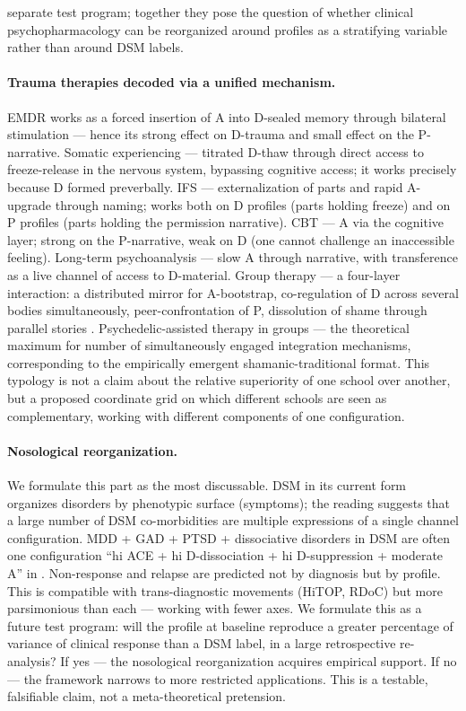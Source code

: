 separate test program; together they pose the question of whether clinical psychopharmacology can be reorganized around \DEIC{} profiles as a stratifying variable rather than around DSM labels.

\paragraph{Trauma therapies decoded via a unified \DEIC{} mechanism.} EMDR works as a forced insertion of A into D-sealed memory through bilateral stimulation --- hence its strong effect on D-trauma and small effect on the P-narrative. Somatic experiencing \citep{levine2015} --- titrated D-thaw through direct access to freeze-release in the nervous system, bypassing cognitive access; it works precisely because D formed preverbally. IFS \citep{schwartz1995} --- externalization of parts and rapid A-upgrade through naming; works both on D profiles (parts holding freeze) and on P profiles (parts holding the permission narrative). CBT --- A via the cognitive layer; strong on the P-narrative, weak on D (one cannot challenge an inaccessible feeling). Long-term psychoanalysis --- slow A through narrative, with transference as a live channel of access to D-material. Group therapy --- a four-layer interaction: a distributed mirror for A-bootstrap, co-regulation of D across several bodies simultaneously, peer-confrontation of P, dissolution of shame through parallel stories \citep[see collected common-factors reviews in][]{wampold2015}. Psychedelic-assisted therapy in groups --- the theoretical maximum for number of simultaneously engaged integration mechanisms, corresponding to the empirically emergent shamanic-traditional format. This typology is not a claim about the relative superiority of one school over another, but a proposed coordinate grid on which different schools are seen as complementary, working with different components of one \DEIC{} configuration.

\paragraph{Nosological reorganization.} We formulate this part as the most discussable. DSM in its current form organizes disorders by phenotypic surface (symptoms); the \DEIC{} reading suggests that a large number of DSM co-morbidities are multiple expressions of a single channel configuration. MDD + GAD + PTSD + dissociative disorders in DSM are often one configuration ``hi ACE + hi D-dissociation + hi D-suppression + moderate A'' in \DEIC{}. Non-response and relapse are predicted not by diagnosis but by profile. This is compatible with trans-diagnostic movements (HiTOP, RDoC) but more parsimonious than each --- working with fewer axes. We formulate this as a future test program: will the \DEIC{} profile at baseline reproduce a greater percentage of variance of clinical response than a DSM label, in a large retrospective re-analysis? If yes --- the nosological reorganization acquires empirical support. If no --- the framework narrows to more restricted applications. This is a testable, falsifiable claim, not a meta-theoretical pretension.

